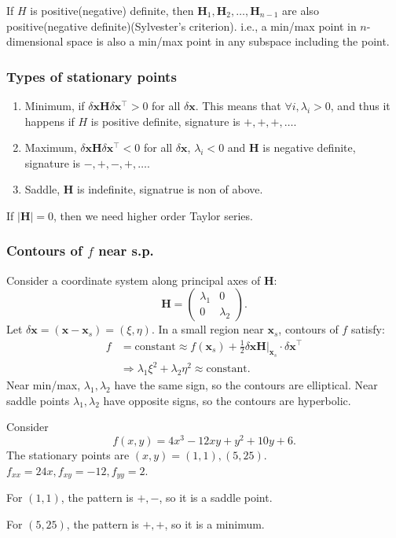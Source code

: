 \documentclass[a4paper]{article}
\begin{document}
      If $H$ is positive(negative) definite, then $\mathbf{H}_1,\mathbf{H}_2,\dots,\mathbf{H}_{n-1}$ are also positive(negative definite)(Sylvester's criterion). i.e., a min/max point in $n$-dimensional space is also a min/max point in any subspace including the point.
      \subsubsection*{Types of stationary points}
      \begin{enumerate}
          \item Minimum, if $\delta\mathbf{x} \mathbf{H} \delta\mathbf{x}^{\top}>0$ for all $ \delta\mathbf{x} $. This means that $ \forall i, \lambda_i>0 $, and thus it happens if $H$ is positive definite, signature is $+,+,+,\dots$.
          \item Maximum, $\delta\mathbf{x} \mathbf{H} \delta\mathbf{x}^{\top}<0$ for all $\delta\mathbf{x}$, $ \lambda_i<0 $ and $\mathbf{H}$ is negative definite, signature is $-,+,-,+,\dots$.
          \item Saddle, $\mathbf{H}$ is indefinite, signatrue is non of above.
      \end{enumerate}
      \begin{remark}
          If $|\mathbf{H}|=0$, then we need higher order Taylor series. 
      \end{remark}
      \subsubsection{Contours of $f$ near s.p.}
      Consider a coordinate system along principal axes of $\mathbf{H}$:
      \[
          \mathbf{H}=\begin{pmatrix}
              \lambda_1&0\\
              0&\lambda_2
          \end{pmatrix}.
      \]
      Let $ \delta\mathbf{x}= (\mathbf{x}-\mathbf{x}_s)=(\xi,\eta) $. In a small region near $\mathbf{x}_s$, contours of $f$ satisfy:
      \begin{align*}
        f&=\text{constant} \approx f(\mathbf{x}_s)+\frac{1}{2}\delta\mathbf{x} \mathbf{H}\Big|_{\mathbf{x}_s}\cdot \delta\mathbf{x}^{\top}\\
        & \Longrightarrow \lambda_1 \xi^2+\lambda_2 \eta^2 \approx \text{constant}.
      \end{align*}
      Near min/max, $ \lambda_1,\lambda_2 $ have the same sign, so the contours are elliptical. Near saddle points $ \lambda_1,\lambda_2 $ have opposite signs, so the contours are hyperbolic.
      \begin{example}
          Consider 
          \[
              f(x,y)=4x^3-12xy+y^2+10y+6.
          \]
          The stationary points are $(x,y)=(1,1), (5,25)$. $f_{xx}=24x, f_{xy}=-12, f_{yy}=2$.

          For $(1,1)$, the pattern is $+,-$, so it is a saddle point.

          For $(5,25)$, the pattern is $+,+$, so it is a minimum.
      \end{example}
\end{document}
